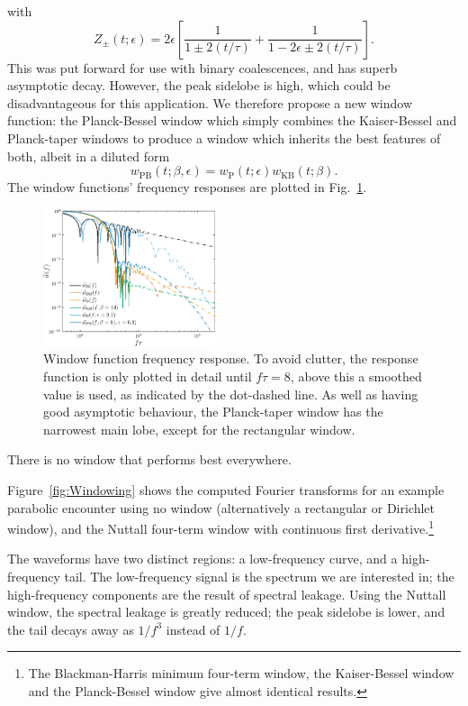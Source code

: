 \documentclass[useAMS,usedcolumn,usegraphicx,usenatbib]{mn2e}
\newcommand{\figref}[1]{Fig.~\ref{fig:#1}}
\newcommand{\Figref}[1]{Figure~\ref{fig:#1}}
\newcommand{\sub}[1]{\ensuremath{_\mathrm{#1}}}
\newcommand{\recip}[1]{\ensuremath{\frac{1}{#1}}}
\begin{document}
with
\begin{equation}
Z_\pm(t; \epsilon) = 2\epsilon\left[\recip{1 \pm 2(t/\tau)} + \recip{1 - 2\epsilon \pm 2(t/\tau)}\right].
\end{equation}
This was put forward for use with binary coalescences, and has superb asymptotic decay. However, the peak sidelobe is high, which could be disadvantageous for this application. We therefore propose a new window function: the Planck-Bessel window which simply combines the Kaiser-Bessel and Planck-taper windows to produce a window which inherits the best features of both, albeit in a diluted form
\begin{equation}
w\sub{PB}(t;\beta,\epsilon) = w\sub{P}(t; \epsilon)w\sub{KB}(t;\beta).
\end{equation}
The window functions' frequency responses are plotted in \figref{Response}.
\begin{figure}
  \begin{center}
  \includegraphics[width=0.45\textwidth]{Fig_Response}
    \caption{Window function frequency response. To avoid clutter, the response function is only plotted in detail until $f\tau = 8$, above this a smoothed value is used, as indicated by the dot-dashed line. As well as having good asymptotic behaviour, the Planck-taper window has the narrowest main lobe, except for the rectangular window.}
    \label{fig:Response}
  \end{center}
\end{figure}
There is no window that performs best everywhere.

\Figref{Windowing} shows the computed Fourier transforms for an example parabolic encounter using no window (alternatively a rectangular or Dirichlet window), and the Nuttall four-term window with continuous first derivative.\footnote{The Blackman-Harris minimum four-term window, the Kaiser-Bessel window and the Planck-Bessel window give almost identical results.}

The waveforms have two distinct regions: a low-frequency curve, and a high-frequency tail. The low-frequency signal is the spectrum we are interested in; the high-frequency components are the result of spectral leakage. Using the Nuttall window, the spectral leakage is greatly reduced; the peak sidelobe is lower, and the tail decays away as $1/{f^3}$ instead of $1/{f}$.
\end{document}
